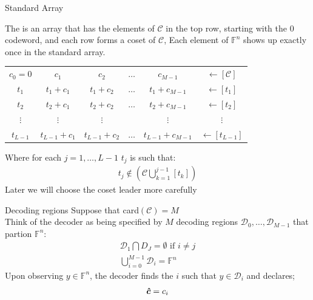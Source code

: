 \begin{parag}{Standard Array}
    \begin{definition}
    The  is an array that has the elements of $\mathcal{C}$ in the top row, starting with the $0$ codeword, and each row forms a coset of $\mathcal{C}$, Each element of $\mathbb{F}^n$ shows up exactly once in the standard array.
    \end{definition}
    \begin{center}
    \begin{tabular}{|ccccc|c}
	    $c_0 = 0$ & $c_1$ & $c_2$ & $\ldots$ & $c_{M-1}$ & $\leftarrow \left[\mathcal{C}\right]$  \\
	    $t_1$ & $t_1 + c_1$ & $t_1 + c_2$ & $\ldots$ & $t_1 +c_{M-1}$ & $\leftarrow \left[t_1\right]$ \\
	    $t_2$ & $t_2 + c_1$ & $t_2 + c_2$ & $\ldots$ & $t_2 + c_{M-1}$ & $\leftarrow \left[t_2\right]$ \\
	    $\vdots$ & $\vdots$ & $\vdots$ &  & $\vdots$ & $\vdots$ \\
	    $t_{L-1}$ & $t_{L-1} + c_1$ & $t_{L-1} + c_2$ & $\ldots$ & $t_{L-1} + c_{M-1}$ & $\leftarrow \left[t_{L-1}\right]$
    \end{tabular}
    \end{center}
    
    Where for each $j =  1, \ldots, L - 1$ $t_j$ is such that:
    \begin{align*} t_j \notin \left(\mathcal{C} \bigcup_{k = 1}^{j-1}[t_k]\right) \end{align*}
    Later we will choose the coset leader more carefully
\end{parag}
\begin{parag}{Decoding regions}
    Suppose that card$\left(\mathcal{C}\right) =  M$\\
   Think of the decoder as being specified by $M$ decoding regions $\mathcal{D}_0, \ldots, \mathcal{D}_{M-1}$ that partion $\mathbb{F}^n$:
   \begin{align*} 
	   \mathcal{D}_1 \bigcap D_J =  \emptyset \text{ if } i \neq j\\
	   \bigcup_{i =  0}^{M-1} \mathcal{D}_i =  \mathbb{F}^n
   \end{align*}
   Upon observing $y \in \mathbb{F}^n$, the decoder finds the $i$ such that $y \in\mathcal{D}_i$ and declares;
   \begin{align*} \bm{\hat{c}} =  c_i \end{align*}
\end{parag}
